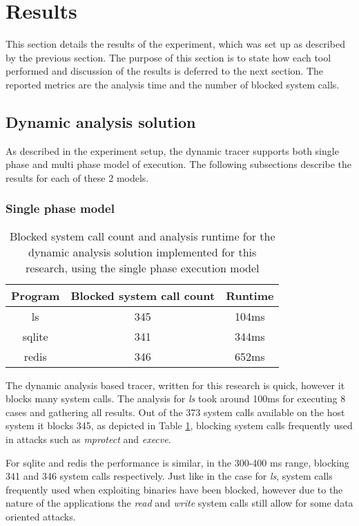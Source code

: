 \section{Results}
\label{sec:results}
This section details the results of the experiment, which was set up as described by the previous section.
The purpose of this section is to state how each tool performed and discussion of the results is deferred to the next section.
The reported metrics are the analysis time and the number of blocked system calls.

\subsection {Dynamic analysis solution}
As described in the experiment setup, the dynamic tracer supports both single phase and multi phase model of execution.
The following subsections describe the results for each of these 2 models.

\subsubsection {Single phase model}
\begin{table}[!h]
\begin{center}
\caption{Blocked system call count and analysis runtime for the dynamic analysis solution implemented for this research, using the single phase execution model}
\label{tbl:dyn_results}
\begin{tabular}{||c c c||} 
 \hline
 Program & Blocked system call count & Runtime \\
 \hline\hline
 ls & 345 & 104ms \\ 
 \hline
 sqlite & 341 & 344ms \\ 
 \hline
 redis & 346 & 652ms \\
 \hline
\end{tabular}
\end{center}
\end{table}

The dynamic analysis based tracer, written for this research is quick, however it blocks many system calls.
The analysis for \textit{ls} took around 100ms for executing 8 cases and gathering all results.
Out of the 373 system calls available on the host system it blocks 345, as depicted in Table \ref{tbl:dyn_results}, blocking system calls frequently used in attacks such as \textit{mprotect} and \textit{execve}.

For sqlite and redis the performance is similar, in the 300-400 ms range, blocking 341 and 346 system calls respectively. Just like in the case for \textit{ls}, system calls frequently used when exploiting binaries have been blocked, however due to the nature of the applications the \textit{read} and \textit{write} system calls still allow for some data oriented attacks.

